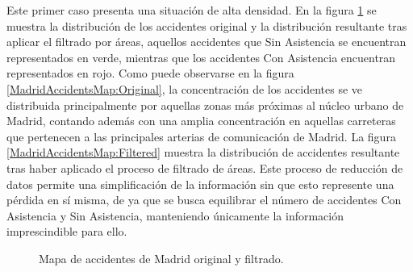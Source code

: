 \documentclass{uathesis-es}
\begin{document}
{Este primer caso presenta una situación de alta densidad. En la figura \ref{MadridAccidentsMap} se muestra la distribución de los accidentes original y la distribución resultante tras aplicar el filtrado por áreas, aquellos accidentes que Sin Asistencia se encuentran representados en verde, mientras que los accidentes Con Asistencia encuentran representados en rojo. Como puede observarse en la figura \ref{MadridAccidentsMap:Original}, la concentración de los accidentes se ve distribuida principalmente por aquellas zonas más próximas al núcleo urbano de Madrid, contando además con una amplia concentración en aquellas carreteras que pertenecen a las principales arterias de comunicación de Madrid. La figura  \ref{MadridAccidentsMap:Filtered} muestra la distribución de accidentes resultante tras haber aplicado el proceso de filtrado de áreas. Este proceso de reducción de datos permite una simplificación de la información sin que esto represente una pérdida en sí misma, de ya que se busca equilibrar el número de accidentes Con Asistencia y Sin Asistencia, manteniendo únicamente la información imprescindible para ello.

\begin{figure}[H]
    \centering
    \caption{Mapa de accidentes de Madrid original y filtrado.}
    \label{MadridAccidentsMap}
\end{figure}

}
\end{document}
